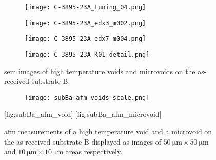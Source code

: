 \begin{figure}[htbp]
    \centering
    \begin{subfigure}[t]{\textwidth}
    \caption{}\label{fig:subBa_voids}
          \begin{minipage}[t]{0.49\linewidth}
            \centering
            \texttt{[image: C-3895-23A\_tuning\_04.png]}
          \end{minipage}
          \hfill
          \begin{minipage}[t]{0.49\linewidth}
            \centering
            \texttt{[image: C-3895-23A\_edx3\_m002.png]}
          \end{minipage}
    \end{subfigure}%
    \par\bigskip
    \begin{subfigure}[t]{\textwidth}
    \caption{}\label{fig:subBa_microvoids}
          \begin{minipage}[t]{0.49\linewidth}
            \centering
            \texttt{[image: C-3895-23A\_edx7\_m004.png]}
          \end{minipage}
          \hfill
          \begin{minipage}[t]{0.49\linewidth}
            \centering
            \texttt{[image: C-3895-23A\_K01\_detail.png]}
          \end{minipage}
    \end{subfigure}%
    \caption[\Ac{sem} images of voids on substrate B.]{\Ac{sem} images of  high temperature voids and  microvoids on the as-received substrate B.}
    \label{fig:SEM_C389523_voids}
\end{figure}

\begin{figure}
    \centering
    \begin{subfigure}[c]{0.032\linewidth}
        \label{fig:subBa_afm_voids_scale}\captionsetup{list=no}
        \texttt{[image: subBa\_afm\_voids\_scale.png]}
    \end{subfigure}
    \hfill
    [fig:subBa_afm_void]
    \hfill
    [fig:subBa_afm_microvoid]
    \caption[\Ac{afm} measurements of void and microvoid on as-received substrate B.]{\Ac{afm} measurements of  a high temperature void and  a microvoid on the as-received substrate B displayed as images of $\SI{50}{\micro\metre}\times\SI{50}{\micro\metre}$ and $\SI{10}{\micro\metre}\times\SI{10}{\micro\metre}$ areas respectively.}
    \label{fig:subBa_afm_voids}
\end{figure}

